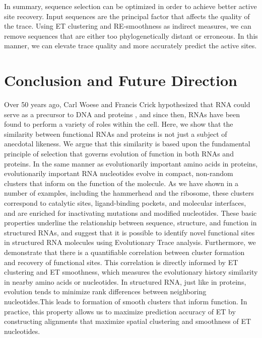 \documentclass[12pt,a4paper]{report}
\begin{document}
In summary, sequence selection can be optimized in order to achieve better active site recovery. Input sequences are the principal factor that affects the quality of the trace. Using ET clustering and RE-smoothness as indirect measures, we can remove sequences that are either too phylogenetically distant or erroneous. In this manner, we can elevate trace quality and more accurately predict the active sites.

\section{Conclusion and Future Direction}
Over 50 years ago, Carl Woese and Francis Crick hypothesized that RNA could serve as a precursor to DNA and proteins \cite{Lehman2010}, and since then, RNAs have been found to perform a variety of roles within the cell. Here, we show that the similarity between functional RNAs and proteins is not just a subject of anecdotal likeness. We argue that this similarity is based upon the fundamental principle of selection that governs evolution of function in both RNAs and proteins. In the same manner as evolutionarily important amino acids in proteins, evolutionarily important RNA nucleotides evolve in compact, non-random clusters that inform on the function of the molecule. As we have shown in a number of examples, including the hammerhead and the ribosome, these clusters correspond to catalytic sites, ligand-binding pockets, and molecular interfaces, and are enriched for inactivating mutations and modified nucleotides. These basic properties underline the relationship between sequence, structure, and function in structured RNAs, and suggest that it is possible to identify novel functional sites in structured RNA molecules using Evolutionary Trace analysis. 
 Furthermore, we demonstrate that there is a quantifiable correlation between cluster formation and recovery of functional sites. This correlation is directly informed by ET clustering and ET smoothness, which measures the evolutionary history similarity in nearby amino acids or nucleotides. In structured RNA, just like in proteins, evolution tends to minimize rank differences between neighboring nucleotides.This leads to formation of smooth clusters that inform function. In practice, this property allows us to maximize prediction accuracy of ET by constructing alignments that maximize spatial clustering and smoothness of ET nucleotides.
 
\end{document}
